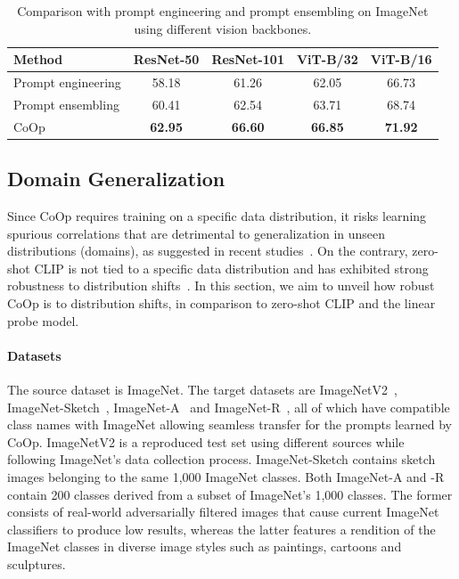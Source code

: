 \begin{table}[t]
    \tabstyle{8pt}
    \caption{Comparison with prompt engineering and prompt ensembling on ImageNet using different vision backbones.}
    \label{tab:vs_prompt_esb}
    \begin{tabular}{l cccc}
    \toprule
    Method & ResNet-50 & ResNet-101 & ViT-B/32 & ViT-B/16 \\
    \midrule
    Prompt engineering & 58.18 & 61.26 & 62.05 & 66.73 \\
    Prompt ensembling & 60.41 & 62.54 & 63.71 & 68.74 \\
    \rowcolor{tabhighlight}
    CoOp & \textbf{62.95} & \textbf{66.60} & \textbf{66.85} & \textbf{71.92} \\
    \bottomrule
    \end{tabular}
\end{table}


\subsection{Domain Generalization} \label{sec:exp;subsec:dg}
Since CoOp requires training on a specific data distribution, it risks learning spurious correlations that are detrimental to generalization in unseen distributions (domains), as suggested in recent studies~\citep{taori2020measuring,zhou2021domain}. On the contrary, zero-shot CLIP is not tied to a specific data distribution and has exhibited strong robustness to distribution shifts~\citep{radford2021learning}. In this section, we aim to unveil how robust CoOp is to distribution shifts, in comparison to zero-shot CLIP and the linear probe model.

\paragraph{Datasets}
The source dataset is ImageNet. The target datasets are ImageNetV2~\citep{recht2019imagenet}, ImageNet-Sketch~\citep{wang2019learning}, ImageNet-A~\citep{hendrycks2021natural} and ImageNet-R~\citep{hendrycks2021many}, all of which have compatible class names with ImageNet allowing seamless transfer for the prompts learned by CoOp. ImageNetV2 is a reproduced test set using different sources while following ImageNet's data collection process. ImageNet-Sketch contains sketch images belonging to the same 1,000 ImageNet classes. Both ImageNet-A and -R contain 200 classes derived from a subset of ImageNet's 1,000 classes. The former consists of real-world adversarially filtered images that cause current ImageNet classifiers to produce low results, whereas the latter features a rendition of the ImageNet classes in diverse image styles such as paintings, cartoons and sculptures.

